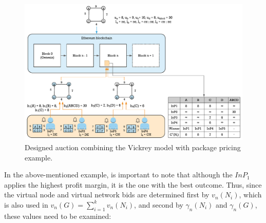 \begin{figure}[bth]
	\centering
	\includegraphics[scale=0.75]{gfx/vickrey}    
  	\caption{Designed auction combining the Vickrey model with package pricing example.}
  	\label{fig:vickrey}
\end{figure}

In the above-mentioned example, is important to note that although the $InP_1$ applies the highest profit margin, it is the one with the best outcome. Thus, since the virtual node and virtual network bids are determined first by $v_n(N_i)$, which is also used in $v_n(G) = \sum_{i=1}^{k} v_n(N_i)$, and second by $\gamma_n(N_i)$ and $\gamma_n(G)$, these values need to be examined:

